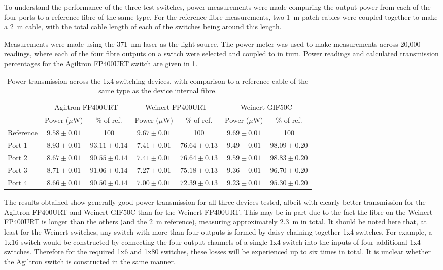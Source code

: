 \documentclass[a4paper,11pt]{article}
\begin{document}
To understand the performance of the three test switches, power measurements were made comparing the output power from each of the four ports to a reference fibre of the same type. For the reference fibre measurements, two 1~m patch cables were coupled together to make a 2~m cable, with the total cable length of each of the switches being around this length.

Measurements were made using the 371~nm laser as the light source. The power meter was used to make measurements across 20,000 readings, where each of the four fibre outputs on a switch were selected and coupled to in turn. Power readings and calculated transmission percentages for the Agiltron FP400URT switch are given in \cref{tab:switchpower}.
\begin{table}[h]
\centering
\begin{tabular}{l|cc|cc|cc}
\hline
\multirow{2}{*}{} & \multicolumn{2}{c|}{Agiltron FP400URT} & \multicolumn{2}{c|}{Weinert FP400URT} & \multicolumn{2}{c}{Weinert GIF50C} \\
			&	Power ($\mu$W) & \% of ref. & Power ($\mu$W) & \% of ref. & Power ($\mu$W) & \% of ref.\\ \hline
Reference	& $9.58\pm0.01$	& 100  			 & $9.67\pm0.01$ & 100 			  & $9.69\pm0.01$ & 100 \\
Port 1		& $8.93\pm0.01$	& $93.11\pm0.14$ & $7.41\pm0.01$ & $76.64\pm0.13$ & $9.49\pm0.01$ & $98.09\pm0.20$ \\
Port 2		& $8.67\pm0.01$	& $90.55\pm0.14$ & $7.41\pm0.01$ & $76.64\pm0.13$ & $9.59\pm0.01$ & $98.83\pm0.20$ \\
Port 3		& $8.71\pm0.01$	& $91.06\pm0.14$ & $7.27\pm0.01$ & $75.18\pm0.13$ & $9.36\pm0.01$ & $96.70\pm0.20$ \\
Port 4		& $8.66\pm0.01$	& $90.50\pm0.14$ & $7.00\pm0.01$ & $72.39\pm0.13$ & $9.23\pm0.01$ & $95.30\pm0.20$ \\
\hline
\end{tabular}
\caption{Power transmission across the 1x4 switching devices, with comparison to a reference cable of the same type as the device internal fibre.}\label{tab:switchpower}
\end{table}
The results obtained show generally good power transmission for all three devices tested, albeit with clearly better transmission for the Agiltron FP400URT and Weinert GIF50C than for the Weinert FP400URT. This may be in part due to the fact the fibre on the Weinert FP400URT is longer than the others (and the 2~m reference), measuring approximately 2.3~m in total. It should be noted here that, at least for the Weinert switches, any switch with more than four outputs is formed by daisy-chaining together 1x4 switches. For example, a 1x16 switch would be constructed by connecting the four output channels of a single 1x4 switch into the inputs of four additional 1x4 switches. Therefore for the required 1x6 and 1x80 switches, these losses will be experienced up to six times in total. It is unclear whether the Agiltron switch is constructed in the same manner.
\end{document}
